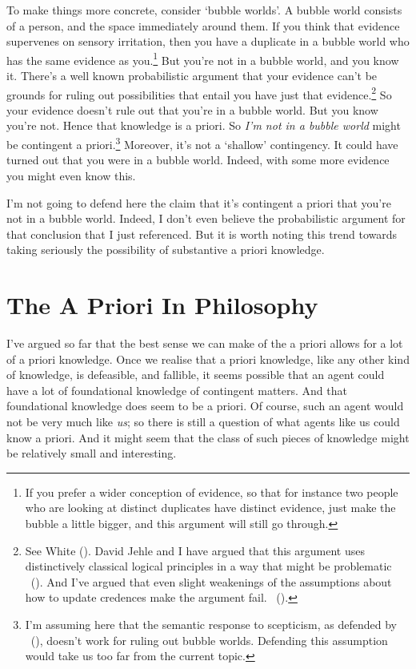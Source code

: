 \documentclass[
  11pt,
  letterpaper,
  DIV=11,
  numbers=noendperiod,
  twoside]{scrartcl}
\begin{document}
To make things more concrete, consider `bubble worlds'. A bubble world
consists of a person, and the space immediately around them. If you
think that evidence supervenes on sensory irritation, then you have a
duplicate in a bubble world who has the same evidence as you.\footnote{If
  you prefer a wider conception of evidence, so that for instance two
  people who are looking at distinct duplicates have distinct evidence,
  just make the bubble a little bigger, and this argument will still go
  through.} But you're not in a bubble world, and you know it. There's a
well known probabilistic argument that your evidence can't be grounds
for ruling out possibilities that entail you have just that
evidence.\footnote{See White (). David
  Jehle and I have argued that this argument uses distinctively
  classical logical principles in a way that might be problematic
  ~(). And I've
  argued that even slight weakenings of the assumptions about how to
  update credences make the argument fail.
  ~().} So your evidence
doesn't rule out that you're in a bubble world. But you know you're not.
Hence that knowledge is a priori. So \emph{I'm not in a bubble world}
might be contingent a priori.\footnote{I'm assuming here that the
  semantic response to scepticism, as defended by
  ~(), doesn't work for
  ruling out bubble worlds. Defending this assumption would take us too
  far from the current topic.} Moreover, it's not a `shallow'
contingency. It could have turned out that you were in a bubble world.
Indeed, with some more evidence you might even know this.

I'm not going to defend here the claim that it's contingent a priori
that you're not in a bubble world. Indeed, I don't even believe the
probabilistic argument for that conclusion that I just referenced. But
it is worth noting this trend towards taking seriously the possibility
of substantive a priori knowledge.

\section{The A Priori In Philosophy}\label{theaprioriinphilosophy}

I've argued so far that the best sense we can make of the a priori
allows for a lot of a priori knowledge. Once we realise that a priori
knowledge, like any other kind of knowledge, is defeasible, and
fallible, it seems possible that an agent could have a lot of
foundational knowledge of contingent matters. And that foundational
knowledge does seem to be a priori. Of course, such an agent would not
be very much like \emph{us}; so there is still a question of what agents
like us could know a priori. And it might seem that the class of such
pieces of knowledge might be relatively small and interesting.
\end{document}
